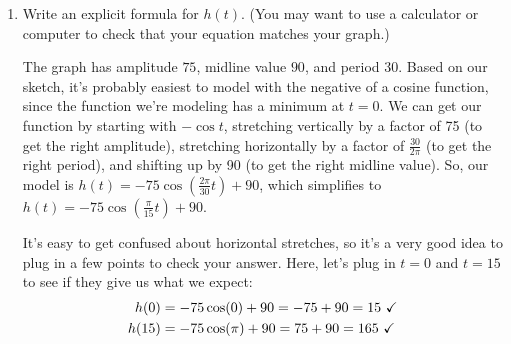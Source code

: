 \documentclass{article}
\begin{document}
\begin{enumerate}[topsep=0pt]
\begin{enumerate}[topsep=0pt]
    \begin{solution}
      At time 0, you are at a height of 15.  Your height then increases
      until you reach the top of the Ferris wheel, which has a height of
      165 (your initial height of 15 meters plus the diameter of the
      Ferris wheel).  This takes 15 minutes since it makes up half a turn
      of the Ferris wheel.  You then come back down until, at time 30,
      your height is again 15 meters.  This repeats over and over, giving
      a graph like this:
      \begin{center}
    \end{center}
    \end{solution}

  \item
    \begin{problem}[\stretch{1}]
      Write an explicit formula for $h(t)$.  (You may want to use a calculator or
      computer to check that your equation matches your graph.)
    \end{problem}

    \begin{solution}
      The graph has amplitude $75$, midline value $90$, and period $30$.
      Based on our sketch, it's probably easiest to model with the
    negative of a cosine function, since the function we're modeling has
    a minimum at $t = 0$.  We can get our function by starting with $-
    \cos t$, stretching vertically by a factor of 75 (to get the right
    amplitude), stretching horizontally by a factor of $\frac{30}{2
      \pi}$ (to get the right period), and shifting up by 90 (to get the
    right midline value).  So, our model is $h(t) = -75 \cos \left(
      \frac{2 \pi}{30} t \right) + 90$, which simplifies to $\boxed{h(t)
      = -75 \cos \left( \frac{\pi}{15} t \right) + 90}$.

      \checkmark
    It's easy to get confused about horizontal stretches, so it's a very
    good idea to plug in a few points to check your answer.  Here, let's
    plug in $t = 0$ and $t = 15$ to see if they give us what we expect:
    \begin{align*}
      h(0) &= -75 \cos(0) + 90 = -75 + 90 = 15 \text{ \checkmark} \\
      h(15) &= -75 \cos (\pi) + 90 = 75 + 90 = 165 \text{ \checkmark}
    \end{align*}
  

\end{solution}
\end{enumerate}
\end{enumerate}
\end{document}
